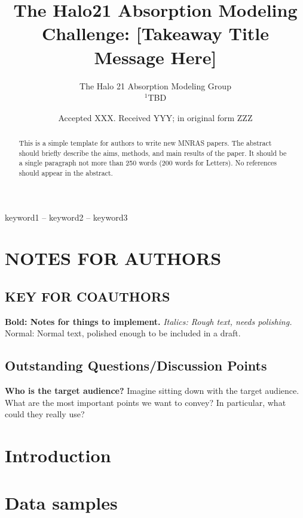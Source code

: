 \documentclass[fleqn,usenatbib]{mnras}
\title[Halo21 CGM Modeling Challenge]{The Halo21 Absorption Modeling Challenge: [Takeaway Title Message Here]}
\author[]{
The Halo 21 Absorption Modeling Group
\\
$^{1}$TBD\\
}
\date{Accepted XXX. Received YYY; in original form ZZZ}
\begin{document}
\label{firstpage}
\pagerange{\pageref{firstpage}--\pageref{lastpage}}
\maketitle

\begin{abstract}
This is a simple template for authors to write new MNRAS papers.
The abstract should briefly describe the aims, methods, and main results of the paper.
It should be a single paragraph not more than 250 words (200 words for Letters).
No references should appear in the abstract.
\end{abstract}

\begin{keywords}
keyword1 -- keyword2 -- keyword3
\end{keywords}


\section{NOTES FOR AUTHORS}

\subsection{KEY FOR COAUTHORS}

\textbf{Bold: Notes for things to implement.}
\textit{Italics: Rough text, needs polishing.}
Normal: Normal text, polished enough to be included in a draft.

\subsection{Outstanding Questions/Discussion Points}

\textbf{Who is the target audience?}
Imagine sitting down with the target audience.
What are the most important points we want to convey?
In particular, what could they really use?

\section{Introduction}


\section{Data samples}
\end{document}
